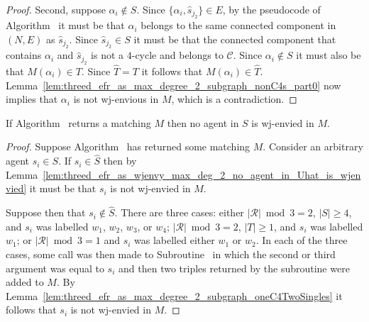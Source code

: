 \begin{proof}
Second, suppose $\alpha_i \notin S$. Since $\{ \alpha_i, \hat{s}_{j_2} \} \in E$, by the pseudocode of Algorithm~ it must be that $\alpha_i$ belongs to the same connected component in $(N, E)$ as $\hat{s}_{j_2}$. Since $\hat{s}_{j_2}\in S$ it must be that the connected component that contains $\alpha_i$ and $\hat{s}_{j_2}$ is not a $4$-cycle and belongs to $\mathcal{C}$. Since $\alpha_i \notin S$ it must also be that $M(\alpha_i) \in T$. Since $\hat{T} = T$ it follows that $M(\alpha_i) \in \hat{T}$. Lemma~\ref{lem:threed_efr_as_max_degree_2_subgraph_nonC4s_part0} now implies that $\alpha_i$ is not wj-envious in $M$, which is a contradiction.
\end{proof}

\begin{lem}
\label{lem:threed_efr_as_wjenvy_max_deg_2_no_agent_in_U_is_wjenvied}
If Algorithm~ returns a matching $M$ then no agent in $S$ is wj-envied in $M$.
\end{lem}
\begin{proof}
Suppose Algorithm~ has returned some matching $M$. Consider an arbitrary agent $s_i \in S$. If $s_i \in \hat{S}$ then by Lemma~\ref{lem:threed_efr_as_wjenvy_max_deg_2_no_agent_in_Uhat_is_wjenvied} it must be that $s_i$ is not wj-envied in $M$. 

Suppose then that $s_i \notin \hat{S}$. There are three cases: either $|\mathcal{R}|\bmod 3 = 2$, $|S|\geq 4$, and $s_i$ was labelled $w_1$, $w_2$, $w_3$, or $w_4$; $|\mathcal{R}|\bmod 3 = 2$, $|T| \geq 1$, and $s_i$ was labelled $w_1$; or $|\mathcal{R}|\bmod 3 = 1$ and $s_i$ was labelled either $w_1$ or $w_2$. In each of the three cases, some call was then made to Subroutine~ in which the second or third argument was equal to $s_i$ and then two triples returned by the subroutine were added to $M$. By Lemma~\ref{lem:threed_efr_as_max_degree_2_subgraph_oneC4TwoSingles} it follows that $s_i$ is not wj-envied in $M$.
\end{proof}

